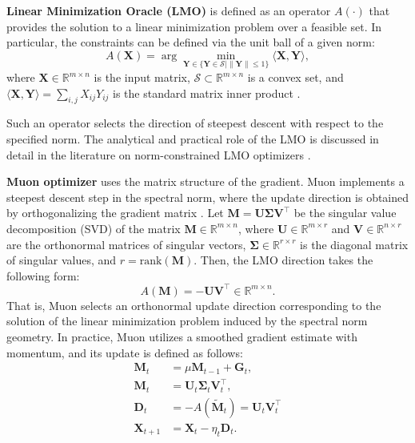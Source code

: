 \documentclass[letterpaper]{article} %
\begin{document}
\textbf{Linear Minimization Oracle (LMO)} is defined as an operator  $A(\cdot)$ that provides the solution to a linear minimization problem over a feasible set. In particular, the constraints can be defined via the unit ball of a given norm:
\begin{equation}
A(\mathbf{X})=\arg\min_{\mathbf{Y} \in \{ \mathbf{Y} \in \mathcal{S} | \|\mathbf{Y}\| \le1\}}\langle \mathbf{X}, \mathbf{Y}\rangle,
\end{equation}
where $\mathbf{X}\in\mathbb{R}^{m\times n}$ is the input matrix, $\mathcal{S}\subset\mathbb{R}^{m\times n}$  is a convex set, and $\langle \mathbf{X},\mathbf{Y}\rangle=\sum_{i,j}{X}_{ij}{Y}_{ij}$ is the standard matrix inner product \cite{pethick2025training}. 

Such an operator selects the direction of steepest descent with respect to the specified norm. The analytical and practical role of the LMO is discussed in detail in the literature on norm-constrained LMO optimizers \cite{pethick2025training, kovalev2025understanding, riabinin2025gluon}.

\textbf{Muon optimizer} uses the matrix structure of the gradient. Muon implements a steepest descent step in the spectral norm, where the update direction is obtained by orthogonalizing the gradient matrix  \cite{bernstein2024old}. Let $\mathbf{M}=\mathbf{U}\boldsymbol{\Sigma}\mathbf{V}^\top$ be the singular value decomposition (SVD) of the matrix $\mathbf{M}\in\mathbb{R}^{m\times n}$, where $\mathbf{U}\in\mathbb{R}^{m\times r}$ and  $\mathbf{V}\in\mathbb{R}^{n\times r}$ are the orthonormal matrices of singular vectors, $\boldsymbol{\Sigma}\in\mathbb{R}^{r\times r}$ is the diagonal matrix of singular values, and $r=\mathrm{rank}(\mathbf{M})$. Then, the LMO direction takes the following form:
\begin{equation}
A(\mathbf{M})=-\mathbf{U}\mathbf{V}^\top \in \mathbb{R}^{m\times n}.
\end{equation}
That is, Muon selects an orthonormal update direction corresponding to the solution of the linear minimization problem induced by the spectral norm geometry. In practice, Muon utilizes a smoothed gradient estimate with momentum, and its update is defined as follows: 
\begin{equation}
    \begin{aligned}
        \mathbf{M}_t &= \mu \mathbf{M}_{t-1} + \mathbf{G}_t, \\
        \mathbf{M}_t &= \mathbf{U}_t \boldsymbol{\Sigma}_t \mathbf{V}_t^\top, \\
        \mathbf{D}_t &= -A(\tilde{\mathbf{M}}_t) = \mathbf{U}_t\mathbf{V}_t^\top\\
        \mathbf{X}_{t+1} &= \mathbf{X}_t - \eta_t \mathbf{D}_t.
    \end{aligned}
\end{equation}
\end{document}
